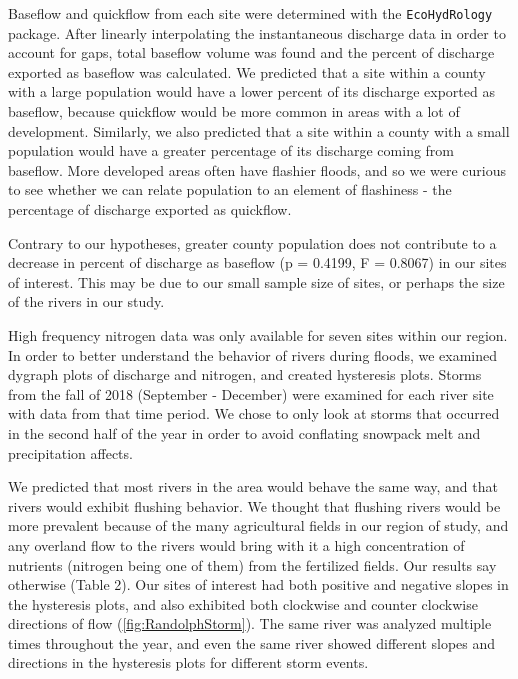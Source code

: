 \documentclass[12pt,]{article}
\begin{document}
Baseflow and quickflow from each site were determined with the
\texttt{EcoHydRology} package. After linearly interpolating the
instantaneous discharge data in order to account for gaps, total
baseflow volume was found and the percent of discharge exported as
baseflow was calculated. We predicted that a site within a county with a
large population would have a lower percent of its discharge exported as
baseflow, because quickflow would be more common in areas with a lot of
development. Similarly, we also predicted that a site within a county
with a small population would have a greater percentage of its discharge
coming from baseflow. More developed areas often have flashier floods,
and so we were curious to see whether we can relate population to an
element of flashiness - the percentage of discharge exported as
quickflow.

Contrary to our hypotheses, greater county population does not
contribute to a decrease in percent of discharge as baseflow (p =
0.4199, F = 0.8067) in our sites of interest. This may be due to our
small sample size of sites, or perhaps the size of the rivers in our
study.

High frequency nitrogen data was only available for seven sites within
our region. In order to better understand the behavior of rivers during
floods, we examined dygraph plots of discharge and nitrogen, and created
hysteresis plots. Storms from the fall of 2018 (September - December)
were examined for each river site with data from that time period. We
chose to only look at storms that occurred in the second half of the
year in order to avoid conflating snowpack melt and precipitation
affects.

We predicted that most rivers in the area would behave the same way, and
that rivers would exhibit flushing behavior. We thought that flushing
rivers would be more prevalent because of the many agricultural fields
in our region of study, and any overland flow to the rivers would bring
with it a high concentration of nutrients (nitrogen being one of them)
from the fertilized fields. Our results say otherwise (Table 2). Our
sites of interest had both positive and negative slopes in the
hysteresis plots, and also exhibited both clockwise and counter
clockwise directions of flow (\autoref{fig:RandolphStorm}). The same
river was analyzed multiple times throughout the year, and even the same
river showed different slopes and directions in the hysteresis plots for
different storm events.
\end{document}
